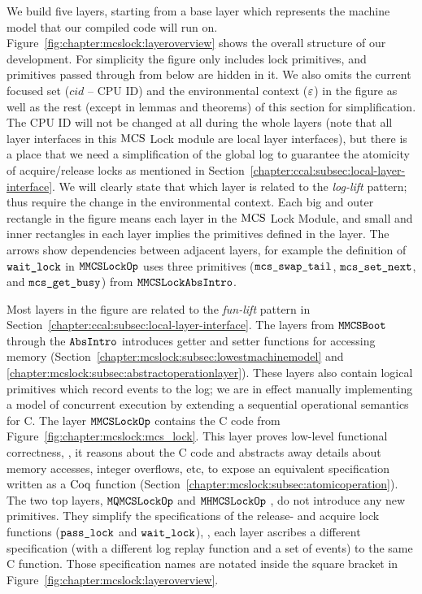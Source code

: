 We build five layers, starting from a base
layer which represents the machine model that our compiled code will
run on.
Figure~\ref{fig:chapter:mcslock:layeroverview} shows the overall structure of our development.
For simplicity the figure only includes lock primitives, and
primitives passed through from below are hidden in it.
We also omits the current focused set ($cid$ -- CPU ID) and the environmental context (${\varepsilon}$) in the figure
 as well as the rest (except in lemmas and theorems) of this section for simplification.
The CPU ID will not be changed at all during the whole layers (note that all  layer interfaces in this $\mathrm{MCS}$ Lock module 
are local layer interfaces), but there is a place that we need a simplification of the global log to guarantee the atomicity of 
acquire/release locks as mentioned in Section~\ref{chapter:ccal:subsec:local-layer-interface}.
We will clearly state that which layer is related to the \textit{log-lift} pattern; 
thus require the change in the environmental context.
Each big and outer rectangle in the figure means each layer in the $\mathrm{MCS}$ Lock Module, 
and small and inner rectangles in each layer implies the primitives defined in the layer.
The arrows show dependencies between adjacent layers,
for example the definition of ${\mathrm{\texttt{wait\_lock}}}$ in  ${\mathrm{\texttt{MMCSLockOp}}}$
uses three primitives (${\mathrm{\texttt{mcs\_swap\_tail}}}$,
${\mathrm{\texttt{mcs\_set\_next}}}$, and ${\mathrm{\texttt{mcs\_get\_busy}}}$) from  ${\mathrm{\texttt{MMCSLockAbsIntro}}}$.

Most layers in the figure are related to the \textit{fun-lift} pattern in Section~\ref{chapter:ccal:subsec:local-layer-interface}.
The layers from  ${\mathrm{\texttt{MMCSBoot}}}$  through the ${\mathrm{\texttt{AbsIntro}}}$
introduces getter and setter functions for accessing memory
(Section~\ref{chapter:mcslock:subsec:lowestmachinemodel} and
\ref{chapter:mcslock:subsec:abstractoperationlayer}). These layers also
contain logical primitives which record events to the log; we are in
effect manually implementing a model of concurrent execution by
extending a sequential operational semantics for C. 
The layer ${\mathrm{\texttt{MMCSLockOp}}}$ contains the C code from 
Figure~\ref{fig:chapter:mcslock:mcs_lock}. This layer proves low-level
functional correctness, \ie, it reasons about the C code and
abstracts away details about memory accesses, integer overflows, etc,
to expose an equivalent specification written as a $\mathrm{Coq}$
function (Section~\ref{chapter:mcslock:subsec:atomicoperation}).
The two top layers, ${\mathrm{\texttt{MQMCSLockOp}}}$ and ${\mathrm{\texttt{MHMCSLockOp}}}$ , do not introduce any new primitives.
They simplify the specifications of 
the release- and acquire lock functions (${\mathrm{\texttt{pass\_lock}}}$ and
${\mathrm{\texttt{wait\_lock}}}$), \ie, each layer ascribes a different
specification (with a different log replay function and a set of events)
to the same C function. Those specification names are notated inside the square bracket in Figure~\ref{fig:chapter:mcslock:layeroverview}.

